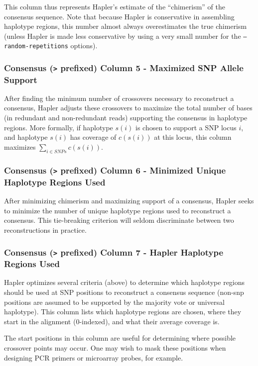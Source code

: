 \documentclass[11pt]{llncs}
\begin{document}
This column thus represents Hapler's estimate of the ``chimerism'' of the consensus sequence. Note that because Hapler is conservative in 
assembling haplotype regions, this number almost always overestimates the true chimerism (unless Hapler is made less conservative by using a very
small number for the \texttt{--random-repetitions} options).

\subsubsection{Consensus (\texttt{>} prefixed) Column 5 - Maximized SNP Allele Support}

After finding the minimum number of crossovers necessary to reconstruct a consensus, Hapler adjusts these crossovers to maximize the total number of
bases (in redundant and non-redundant reads) supporting the consensus in haplotype regions. More formally, if haplotype $s(i)$ is chosen to support
a SNP locus $i$, and haplotype $s(i)$ has coverage of $c(s(i))$ at this locus, this column maximizes $\sum_{i \in SNPs}c(s(i))$.

\subsubsection{Consensus (\texttt{>} prefixed) Column 6 - Minimized Unique Haplotype Regions Used}

After minimizing chimerism and maximizing support of a consensus, Hapler seeks to minimize the number of unique haplotype regions used
to reconstruct a consensus. This tie-breaking criterion will seldom discriminate between two reconstructions in practice.

\subsubsection{Consensus (\texttt{>} prefixed) Column 7 - Hapler Haplotype Regions Used}

Hapler optimizes several criteria (above) to determine which haplotype regions should be used at SNP positions to reconstruct a consensus sequence 
(non-snp positions are assumed to be supported by the majority vote or universal haplotype). This column lists which haplotype regions are chosen, 
where they start in the alignment (0-indexed), and what their average coverage is.

The start positions in this column are useful for determining where possible crossover points may occur. One may wish to mask these positions when designing
PCR primers or microarray probes, for example. 
\end{document}
